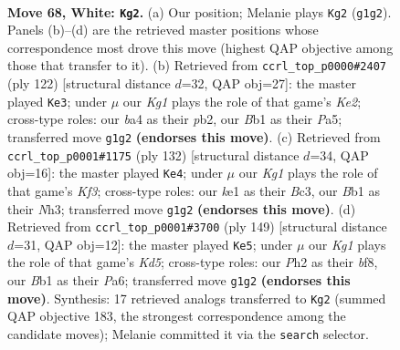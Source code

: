 \documentclass[11pt]{article}
\begin{document}
\clearpage

\begin{figure}[p]\centering
\begin{subfigure}{0.46\textwidth}\centering
\resizebox{\linewidth}{!}{%
\newchessgame
\chessboard[
  setfen={8/2r2p1p/n5p1/4P3/b4Pp1/8/7P/1B2kNK1 w - - 26 68},
  showmover=false,
  pgfstyle=straightmove, color=movearrow, markmove={g1-g2}
]}
\caption{}
\end{subfigure}\hfill
\begin{subfigure}{0.46\textwidth}\centering
\resizebox{\linewidth}{!}{%
\newchessgame
\chessboard[
  setfen={8/6p1/p4pP1/P3pP2/4P3/2k5/1p1NK3/8 w - - 9 62},
  showmover=false,
  pgfstyle=straightmove, color=movearrow, markmove={e2-e3}
]}
\caption{}
\end{subfigure}
\\[4pt]
\begin{subfigure}{0.46\textwidth}\centering
\resizebox{\linewidth}{!}{%
\newchessgame
\chessboard[
  setfen={8/4b3/4k1p1/2p4p/1n3P2/2BPPK1N/8/8 w - - 5 67},
  showmover=false,
  pgfstyle=straightmove, color=movearrow, markmove={f3-e4}
]}
\caption{}
\end{subfigure}\hfill
\begin{subfigure}{0.46\textwidth}\centering
\resizebox{\linewidth}{!}{%
\newchessgame
\chessboard[
  setfen={5B2/7p/p5p1/P2n1p2/3k3P/1B4P1/3K1P2/5b2 b - - 0 75},
  showmover=false,
  pgfstyle=straightmove, color=movearrow, markmove={d4-e5}
]}
\caption{}
\end{subfigure}
\caption{\textbf{Move 68, White: \texttt{Kg2}.} (a) Our position; Melanie plays \texttt{Kg2} (\texttt{g1g2}). Panels (b)--(d) are the retrieved master positions whose correspondence most drove this move (highest QAP objective among those that transfer to it). (b) Retrieved from \texttt{ccrl\_top\_p0000\#2407} (ply 122) [structural distance $d$=32, QAP obj=27]: the master played \texttt{Ke3}; under $\mu$ our \emph{Kg1} plays the role of that game's \emph{Ke2}; cross-type roles: our \emph{b}a4 as their \emph{p}b2, our \emph{B}b1 as their \emph{P}a5; transferred move \texttt{g1g2} \textbf{(endorses this move)}. (c) Retrieved from \texttt{ccrl\_top\_p0001\#1175} (ply 132) [structural distance $d$=34, QAP obj=16]: the master played \texttt{Ke4}; under $\mu$ our \emph{Kg1} plays the role of that game's \emph{Kf3}; cross-type roles: our \emph{k}e1 as their \emph{B}c3, our \emph{B}b1 as their \emph{N}h3; transferred move \texttt{g1g2} \textbf{(endorses this move)}. (d) Retrieved from \texttt{ccrl\_top\_p0001\#3700} (ply 149) [structural distance $d$=31, QAP obj=12]: the master played \texttt{Ke5}; under $\mu$ our \emph{Kg1} plays the role of that game's \emph{Kd5}; cross-type roles: our \emph{P}h2 as their \emph{b}f8, our \emph{B}b1 as their \emph{P}a6; transferred move \texttt{g1g2} \textbf{(endorses this move)}. Synthesis: 17 retrieved analogs transferred to \texttt{Kg2} (summed QAP objective 183, the strongest correspondence among the candidate moves); Melanie committed it via the \texttt{search} selector.}
\label{fig:thought-m134}
\end{figure}
\end{document}

